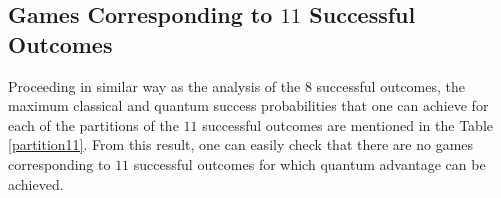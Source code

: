 \documentclass[]{svjour3}
\begin{document}

\subsection{Games Corresponding to $11$ Successful Outcomes}


Proceeding in similar way as the analysis of the $8$ successful outcomes, the maximum classical and quantum success probabilities that one can achieve for each of the partitions of the $11$ successful outcomes are mentioned in the Table \ref{partition11}. From this result, one can easily check that there are no games corresponding to $11$ successful outcomes for which quantum advantage can be achieved.


\begin{table}[htb]
	\begin{center}
		\setlength{\tabcolsep}{0.35em}
	\end{center}
	\caption{Analysis of partitions for $11$ successful outcomes} 
	\label{partition11}
\end{table}
\end{document}
